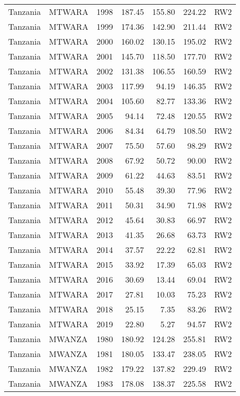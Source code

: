 \begin{longtable}{lllrrrl}
  Tanzania & MTWARA & 1998 & 187.45 & 155.80 & 224.22 & RW2 \\ 
  Tanzania & MTWARA & 1999 & 174.36 & 142.90 & 211.44 & RW2 \\ 
  Tanzania & MTWARA & 2000 & 160.02 & 130.15 & 195.02 & RW2 \\ 
  Tanzania & MTWARA & 2001 & 145.70 & 118.50 & 177.70 & RW2 \\ 
  Tanzania & MTWARA & 2002 & 131.38 & 106.55 & 160.59 & RW2 \\ 
  Tanzania & MTWARA & 2003 & 117.99 & 94.19 & 146.35 & RW2 \\ 
  Tanzania & MTWARA & 2004 & 105.60 & 82.77 & 133.36 & RW2 \\ 
  Tanzania & MTWARA & 2005 & 94.14 & 72.48 & 120.55 & RW2 \\ 
  Tanzania & MTWARA & 2006 & 84.34 & 64.79 & 108.50 & RW2 \\ 
  Tanzania & MTWARA & 2007 & 75.50 & 57.60 & 98.29 & RW2 \\ 
  Tanzania & MTWARA & 2008 & 67.92 & 50.72 & 90.00 & RW2 \\ 
  Tanzania & MTWARA & 2009 & 61.22 & 44.63 & 83.51 & RW2 \\ 
  Tanzania & MTWARA & 2010 & 55.48 & 39.30 & 77.96 & RW2 \\ 
  Tanzania & MTWARA & 2011 & 50.31 & 34.90 & 71.98 & RW2 \\ 
  Tanzania & MTWARA & 2012 & 45.64 & 30.83 & 66.97 & RW2 \\ 
  Tanzania & MTWARA & 2013 & 41.35 & 26.68 & 63.73 & RW2 \\ 
  Tanzania & MTWARA & 2014 & 37.57 & 22.22 & 62.81 & RW2 \\ 
  Tanzania & MTWARA & 2015 & 33.92 & 17.39 & 65.03 & RW2 \\ 
  Tanzania & MTWARA & 2016 & 30.69 & 13.44 & 69.04 & RW2 \\ 
  Tanzania & MTWARA & 2017 & 27.81 & 10.03 & 75.23 & RW2 \\ 
  Tanzania & MTWARA & 2018 & 25.15 & 7.35 & 83.26 & RW2 \\ 
  Tanzania & MTWARA & 2019 & 22.80 & 5.27 & 94.57 & RW2 \\ 
  Tanzania & MWANZA & 1980 & 180.92 & 124.28 & 255.81 & RW2 \\ 
  Tanzania & MWANZA & 1981 & 180.05 & 133.47 & 238.05 & RW2 \\ 
  Tanzania & MWANZA & 1982 & 179.22 & 137.82 & 229.49 & RW2 \\ 
  Tanzania & MWANZA & 1983 & 178.08 & 138.37 & 225.58 & RW2 \\ 

\end{longtable}
